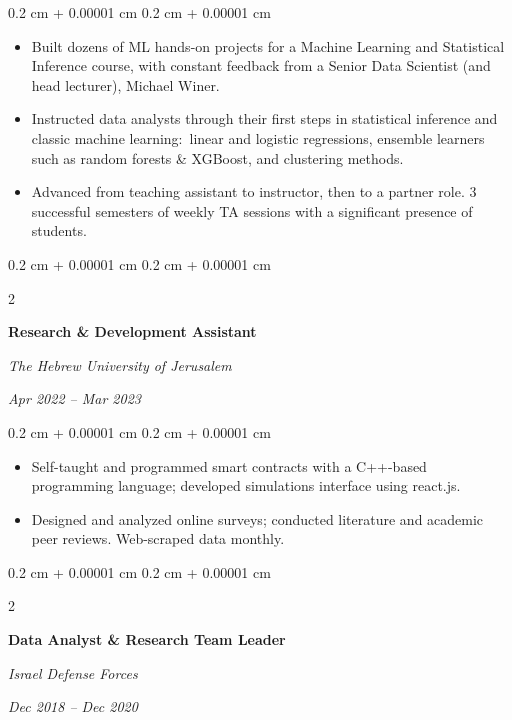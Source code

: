 \documentclass[10pt, letterpaper]{article}
\newenvironment{highlights}{
    \begin{itemize}[
        topsep=0.10 cm,
        parsep=0.8 cm,
        partopsep=0pt,
        itemsep=0pt,
        leftmargin=0.4 cm + 10pt
    ]
}{
    \end{itemize}
} %
\newenvironment{onecolentry}{
    \begin{adjustwidth}{
        0.2 cm + 0.00001 cm
    }{
        0.2 cm + 0.00001 cm
    }
}{
    \end{adjustwidth}
} %
\newenvironment{twocolentry}[2][]{
    \onecolentry
    \def\secondColumn{#2}
    \setcolumnwidth{\fill, 4.5 cm}
    \begin{paracol}{2}
}{
    \switchcolumn \raggedleft \secondColumn
    \end{paracol}
    \endonecolentry
} %
\begin{document}
        \vspace{0.10 cm}
        \begin{onecolentry}
            \begin{highlights}
                \item Built dozens of ML hands-on projects for a Machine Learning and Statistical Inference course, with constant feedback from a Senior Data Scientist (and head lecturer), Michael Winer.
                \item Instructed data analysts through their first steps in statistical inference and classic machine learning$:$ linear and logistic regressions, ensemble learners such as random forests \& XGBoost, and clustering methods.
                \item Advanced from teaching assistant to instructor, then to a partner role. 3 successful semesters of weekly TA sessions with a significant presence of students.
            \end{highlights}
        \end{onecolentry}


        \vspace{0.2 cm}

        \begin{twocolentry}{
            
            
        \textit{Apr 2022 – Mar 2023}}
            \textbf{Research \& Development Assistant}
            
            \textit{The Hebrew University of Jerusalem}
        \end{twocolentry}

        \vspace{0.10 cm}
        \begin{onecolentry}
            \begin{highlights}
                \item Self-taught and programmed smart contracts with a C++-based programming language; developed simulations interface using react.js.
                \item Designed and analyzed online surveys; conducted literature and academic peer reviews. Web-scraped data monthly.
            \end{highlights}
        \end{onecolentry}


        \vspace{0.2 cm}

        \begin{twocolentry}{
            
            
        \textit{Dec 2018 – Dec 2020}}
            \textbf{Data Analyst \& Research Team Leader}
            
            \textit{Israel Defense Forces}
        \end{twocolentry}
\end{document}
